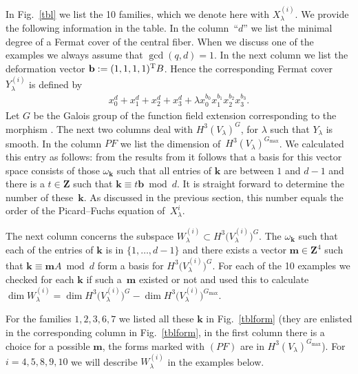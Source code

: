 \documentclass[pdftex]{sigma}
\numberwithin{equation}{section}
\begin{document}
In Fig.~\ref{tbl} we list the 10 families, which we denote here with $X^{(i)}_\lambda$. We provide the following information in the table. In the column~``$d$'' we list the minimal degree of a Fermat cover of the central f\/iber. When we discuss one of the examples we always assume that $\gcd(q,d)=1$. In the next column we list the deformation vector $\mathbf{b}:=(1,1,1,1)^{\rm T} B$. Hence the corresponding Fermat cover $Y_\lambda^{(i)}$ is def\/ined by
 \begin{gather*} x_0^d+x_1^d+x_2^d+x_3^d+\lambda x_0^{b_0}x_1^{b_1}x_2^{b_2}x_3^{b_3}.\end{gather*}
Let $G$ be the Galois group of the function f\/ield extension corresponding to the morphism . The next two columns deal with $H^3(V_\lambda)^G$, for $\lambda$ such that $Y_\lambda$ is smooth. In the column $PF$ we list the dimension of~$H^3(V_{\lambda})^{G_{\max}}$. We calculated this entry as follows: from the results from \cite[Section~4]{Zetafamrec} it follows that a basis for this vector space consists of those $\omega_{\mathbf{k}}$ such that all entries of $\mathbf{k}$ are between $1$ and $d-1$ and there is a $t\in \mathbf{Z}$ such that $\mathbf{k} \equiv t \mathbf{b} \bmod d$. It is straight forward to determine the number of these~$\mathbf{k}$. As discussed in the previous section, this number equals the order of the Picard--Fuchs equation of~$X_{\lambda}^{i}$.

The next column concerns the subspace $W^{(i)}_\lambda \subset H^3\big(V^{(i)}_{\lambda}\big)^G$. The $\omega_{\mathbf{k}}$ such that each of the entries of $\mathbf{k}$ is in $\{1,\dots,d-1\}$ and there exists a vector $\mathbf{m} \in \mathbf{Z}^4$ such that $\mathbf{k}\equiv \mathbf{m} A \bmod d$ form a basis for $H^3\big(V_{\lambda}^{(i)}\big)^G$. For each of the 10 examples we checked for each $\mathbf{k}$ if such a~$\mathbf{m}$ existed or not and used this to calculate $\dim W_{\lambda}^{(i)}=\dim H^3\big(V_{\lambda}^{(i)}\big)^G-\dim H^3\big(V^{(i)}_{\lambda}\big)^{G_{\max}}$.

For the families $1,2,3,6,7$ we listed all these $\mathbf{k}$ in Fig.~\ref{tblform} (they are enlisted in the corresponding column in Fig.~\ref{tblform}, in the f\/irst column there is a choice for a possible $\mathbf{m}$, the forms marked with $(PF)$ are in $H^3(V_{\lambda})^{G_{\max}}$). For $i=4,5,8,9,10$ we will describe $W_{\lambda}^{(i)}$ in the examples below.
\end{document}
